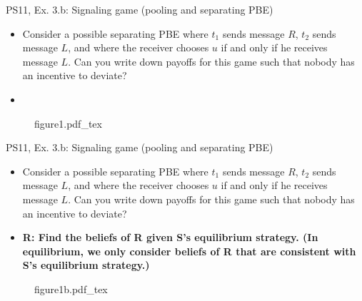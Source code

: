 \begin{frame}{PS11, Ex. 3.b: Signaling game (pooling and separating PBE)}
    \begin{itemize}
        \item[(b)] Consider a possible separating PBE where $t_1$ sends message $R$, $t_2$ sends message $L$, and where the receiver chooses $u$ if and only if he receives message $L$. Can you write down payoffs for this game such that nobody has an incentive to deviate?
    \end{itemize} \vspace{-8pt}
    \begin{multicols}{2}
      \begin{itemize}
        \item[SR3:]
      \end{itemize}
      \vfill\null\columnbreak
      \begin{figure}[!h]
        \center\def\svgwidth{\columnwidth}
        {figure1.pdf_tex}
      \end{figure}
      \vfill\null \columnbreak
      \vfill
    \end{multicols}
\end{frame}
\begin{frame}{PS11, Ex. 3.b: Signaling game (pooling and separating PBE)}
    \begin{itemize}
        \item[(b)] Consider a possible separating PBE where $t_1$ sends message $R$, $t_2$ sends message $L$, and where the receiver chooses $u$ if and only if he receives message $L$. Can you write down payoffs for this game such that nobody has an incentive to deviate?
    \end{itemize} \vspace{-8pt}
    \begin{multicols}{2}
      \begin{itemize}
        \item[SR3:] \textbf{R: Find the beliefs of R given S's equilibrium strategy. (In equilibrium, we only consider beliefs of R that are consistent with S's equilibrium strategy.)}
      \end{itemize}
      \vfill\null\columnbreak
      \begin{figure}[!h]
        \center\def\svgwidth{\columnwidth}
        {figure1b.pdf_tex}
      \end{figure}
      \vfill\null \columnbreak
      \vfill
    \end{multicols}
\end{frame}
